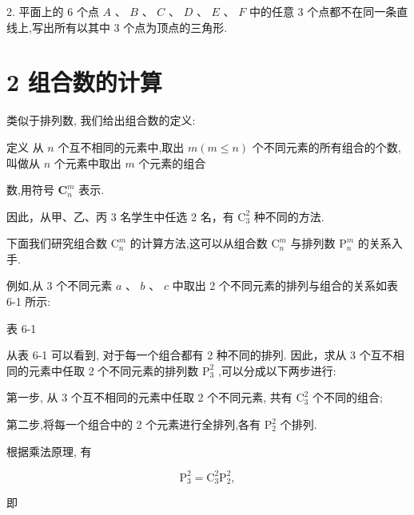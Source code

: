 \documentclass[10pt]{article}
\begin{document}
2. 平面上的 6 个点 \(A\text{ 、 }B\text{ 、 }C\text{ 、 }D\text{ 、 }E\text{ 、 }F\) 中的任意 3 个点都不在同一条直线上,写出所有以其中 3 个点为顶点的三角形.

\section*{2 组合数的计算}

类似于排列数, 我们给出组合数的定义:

定义 从 \(n\) 个互不相同的元素中,取出 \(m\left( {m \leq  n}\right)\) 个不同元素的所有组合的个数,叫做从 \(n\) 个元素中取出 \(m\) 个元素的组合



数,用符号 \({\mathbf{C}}_{n}^{m}\) 表示.

因此，从甲、乙、丙 3 名学生中任选 2 名，有 \({\mathrm{C}}_{3}^{2}\) 种不同的方法.

下面我们研究组合数 \({\mathrm{C}}_{n}^{m}\) 的计算方法,这可以从组合数 \({\mathrm{C}}_{n}^{m}\) 与排列数 \({\mathrm{P}}_{n}^{m}\) 的关系入手.

例如,从 3 个不同元素 \(a\text{ 、 }b\text{ 、 }c\) 中取出 2 个不同元素的排列与组合的关系如表 6-1 所示:

表 6-1

\begin{center}
\end{center}

从表 6-1 可以看到, 对于每一个组合都有 2 种不同的排列. 因此，求从 3 个互不相同的元素中任取 2 个不同元素的排列数 \({\mathrm{P}}_{3}^{2}\) ,可以分成以下两步进行:

第一步, 从 3 个互不相同的元素中任取 2 个不同元素, 共有 \({\mathrm{C}}_{3}^{2}\) 个不同的组合;

第二步,将每一个组合中的 2 个元素进行全排列,各有 \({\mathrm{P}}_{2}^{2}\) 个排列.

根据乘法原理, 有

\[
{\mathrm{P}}_{3}^{2} = {\mathrm{C}}_{3}^{2}{\mathrm{P}}_{2}^{2},
\]

即
\end{document}
